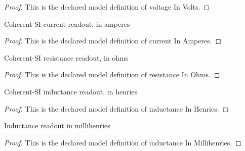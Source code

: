 \begin{proof}
  This is the declared model definition of voltage In Volts.
\end{proof}
\begin{definition}
  \label{def:physics:phyx-mini-0986:phyxminiproblems-problemphyxmini0986-currentinamperes}
  Coherent-SI current readout, in amperes
\end{definition}
\begin{proof}
  This is the declared model definition of current In Amperes.
\end{proof}
\begin{definition}
  \label{def:physics:phyx-mini-0986:phyxminiproblems-problemphyxmini0986-resistanceinohms}
  Coherent-SI resistance readout, in ohms
\end{definition}
\begin{proof}
  This is the declared model definition of resistance In Ohms.
\end{proof}
\begin{definition}
  \label{def:physics:phyx-mini-0986:phyxminiproblems-problemphyxmini0986-inductanceinhenries}
  Coherent-SI inductance readout, in henries
\end{definition}
\begin{proof}
  This is the declared model definition of inductance In Henries.
\end{proof}
\begin{definition}
  \label{def:physics:phyx-mini-0986:phyxminiproblems-problemphyxmini0986-inductanceinmillihenries}
  Inductance readout in millihenries
\end{definition}
\begin{proof}
  This is the declared model definition of inductance In Millihenries.
\end{proof}
